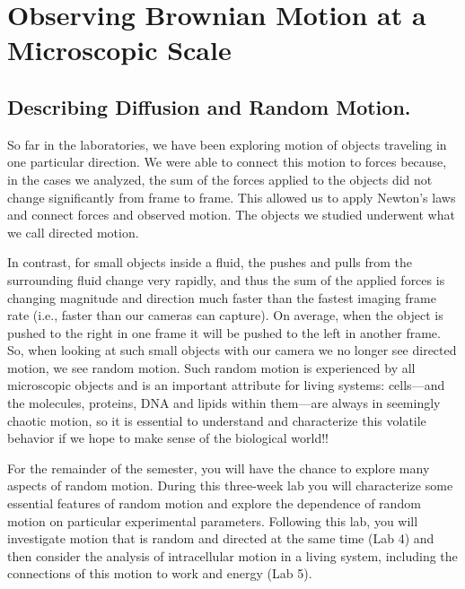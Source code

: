 \chapter{Observing Brownian Motion at a Microscopic Scale}
\thispagestyle{fancy}
%
\section{Describing Diffusion and Random Motion.}
So far in the laboratories, we have been exploring motion of objects traveling in one particular direction.
We were able to connect this motion to forces because, in the cases we analyzed, the sum of the forces applied to the objects did not change significantly from frame to frame.
This allowed us to apply Newton’s laws and connect forces and observed motion.
The objects we studied underwent what we call directed motion.
\par
In contrast, for small objects inside a fluid, the pushes and pulls from the surrounding fluid change very rapidly, and thus the sum of the applied forces is changing magnitude and direction much faster than the fastest imaging frame rate (i.e., faster than our cameras can capture).
On average, when the object is pushed to the right in one frame it will be pushed to the left in another frame.
So, when looking at such small objects with our camera we no longer see directed motion, we see random motion.
Such random motion is experienced by all microscopic objects and is an important attribute for living systems: cells—and the molecules, proteins, DNA and lipids within them—are always in seemingly chaotic motion, so it is essential to understand and characterize this volatile behavior if we hope to make sense of the biological world!!
\par
For the remainder of the semester, you will have the chance to explore many aspects of random motion.
During this three-week lab you will characterize some essential features of random motion and explore the dependence of random motion on particular experimental parameters.
Following this lab, you will investigate motion that is random and directed at the same time (Lab 4) and then consider the analysis of intracellular motion in a living system, including the connections of this motion to work and energy (Lab 5).

